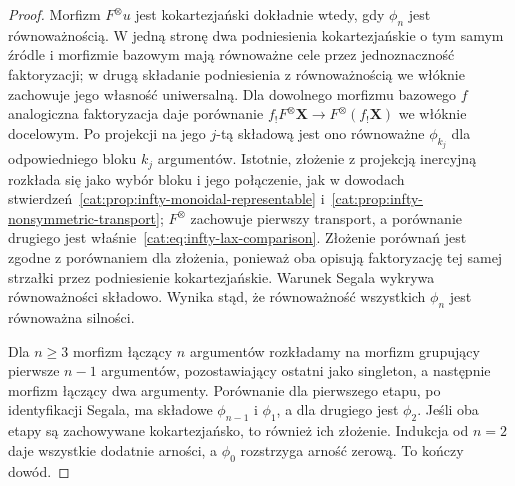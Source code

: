 \begin{proof}
Morfizm $F^\otimes u$ jest kokartezjański dokładnie wtedy, gdy $\phi_n$ jest równoważnością. W jedną stronę dwa podniesienia kokartezjańskie o tym samym źródle i morfizmie bazowym mają równoważne cele przez jednoznaczność faktoryzacji; w drugą składanie podniesienia z równoważnością we włóknie zachowuje jego własność uniwersalną. Dla dowolnego morfizmu bazowego $f$ analogiczna faktoryzacja daje porównanie $f_!F^\otimes\mathbf X\to F^\otimes(f_!\mathbf X)$ we włóknie docelowym. Po projekcji na jego $j$-tą składową jest ono równoważne $\phi_{k_j}$ dla odpowiedniego bloku $k_j$ argumentów. Istotnie, złożenie z projekcją inercyjną rozkłada się jako wybór bloku i jego połączenie, jak w dowodach stwierdzeń~\ref{cat:prop:infty-monoidal-representable} i~\ref{cat:prop:infty-nonsymmetric-transport}; $F^\otimes$ zachowuje pierwszy transport, a porównanie drugiego jest właśnie~\eqref{cat:eq:infty-lax-comparison}. Złożenie porównań jest zgodne z porównaniem dla złożenia, ponieważ oba opisują faktoryzację tej samej strzałki przez podniesienie kokartezjańskie. Warunek Segala wykrywa równoważności składowo. Wynika stąd, że równoważność wszystkich $\phi_n$ jest równoważna silności.

Dla $n\geq3$ morfizm łączący $n$ argumentów rozkładamy na morfizm grupujący pierwsze $n-1$ argumentów, pozostawiający ostatni jako singleton, a następnie morfizm łączący dwa argumenty. Porównanie dla pierwszego etapu, po identyfikacji Segala, ma składowe $\phi_{n-1}$ i $\phi_1$, a dla drugiego jest $\phi_2$. Jeśli oba etapy są zachowywane kokartezjańsko, to również ich złożenie. Indukcja od $n=2$ daje wszystkie dodatnie arności, a $\phi_0$ rozstrzyga arność zerową. To kończy dowód.
\end{proof}

